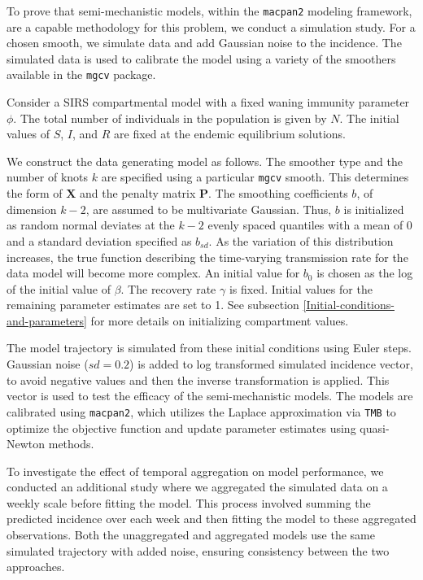 \documentclass[
11pt, %
oneside, %
english, %
singlespacing, %
]{macthesis} %
\begin{document}
To prove that semi-mechanistic models, within the \texttt{macpan2} modeling framework, are a capable methodology for this problem, we conduct a simulation study. For a chosen smooth, we simulate data and add Gaussian noise to the incidence. The simulated data is used to calibrate the model using a variety of the smoothers available in the \texttt{mgcv} package.

Consider a SIRS compartmental model with a fixed waning immunity parameter \(\phi\). The total number of individuals in the population is given by \(N\). The initial values of \(S\), \(I\), and \(R\) are fixed at the endemic equilibrium solutions.

We construct the data generating model as follows. The smoother type and the number of knots \(k\) are specified using a particular \texttt{mgcv} smooth. This determines the form of \(\mathbf{X}\) and the penalty matrix \(\mathbf{P}\). The smoothing coefficients \(b\), of dimension \(k-2\), are assumed to be multivariate Gaussian. Thus, \(b\) is initialized as random normal deviates at the \(k-2\) evenly spaced quantiles with a mean of 0 and a standard deviation specified as \(b_{sd}\). As the variation of this distribution increases, the true function describing the time-varying transmission rate for the data model will become more complex. An initial value for \(b_0\) is chosen as the log of the initial value of \(\beta\). The recovery rate \(\gamma\) is fixed. Initial values for the remaining parameter estimates are set to 1. See subsection \ref{Initial-conditions-and-parameters} for more details on initializing compartment values.

The model trajectory is simulated from these initial conditions using Euler steps. Gaussian noise (\(sd = 0.2\)) is added to log transformed simulated incidence vector, to avoid negative values and then the inverse transformation is applied. This vector is used to test the efficacy of the semi-mechanistic models. The models are calibrated using \texttt{macpan2}, which utilizes the Laplace approximation via \texttt{TMB} to optimize the objective function and update parameter estimates using quasi-Newton methods.

To investigate the effect of temporal aggregation on model performance, we conducted an additional study where we aggregated the simulated data on a weekly scale before fitting the model. This process involved summing the predicted incidence over each week and then fitting the model to these aggregated observations. Both the unaggregated and aggregated models use the same simulated trajectory with added noise, ensuring consistency between the two approaches.
\end{document}
